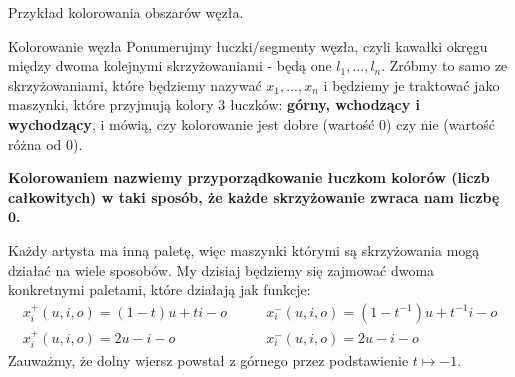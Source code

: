\documentclass{article}
\begin{document}
\begin{center}

  Przykład kolorowania obszarów węzła.
\end{center}

\begin{definition}{Kolorowanie węzła}{}
  Ponumerujmy łuczki/segmenty węzła, czyli kawałki okręgu między dwoma kolejnymi skrzyżowaniami - będą one $l_1,..., l_n$. Zróbmy to samo ze skrzyżowaniami, które będziemy nazywać $x_1,..., x_n$ i będziemy je traktować jako maszynki, które przyjmują kolory $3$ łuczków: \textbf{górny, wchodzący i wychodzący}, i mówią, czy kolorowanie jest dobre (wartość $0$) czy nie (wartość różna od $0$).

  {\bfseries\color{green}Kolorowaniem nazwiemy przyporządkowanie łuczkom kolorów (liczb całkowitych) w taki sposób, że każde skrzyżowanie zwraca nam liczbę $\boldsymbol0$.}
\end{definition}

Każdy artysta ma inną paletę, więc maszynki którymi są skrzyżowania mogą działać na wiele sposobów. My dzisiaj będziemy się zajmować dwoma konkretnymi paletami, które działają jak funkcje:
\begin{align*}
  x_i^+(u, i, o)=(1-t)u+ti-o \quad & \quad x_i^-(u,i,o)=(1-t^{-1})u+t^{-1}i-o\\ 
  x_i^+(u,i,o)=2u-i-o \quad & \quad x_i^-(u,i,o)=2u-i-o
\end{align*}
Zauważmy, że dolny wiersz powstał z górnego przez podstawienie $t\mapsto -1$.
\end{document}
